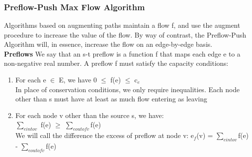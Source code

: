 \documentclass{article}
\begin{document}
\\

\\

\\

\subsubsection{Preflow-Push Max Flow Algorithm}
Algorithms based on augmenting paths maintain a flow f, and use the augment procedure to increase the value of the flow. By way of contrast, the Preflow-Push Algorithm will, in essence, increase the flow on an edge-by-edge basis.\\

\textbf{Preflows} We say that an s-t preflow is a function f that maps each edge e to a non-negative real number. A preflow f must satisfy the capacity conditions:\\

\begin{enumerate}
    \item For each e $\in$ E, we have 0 $\le$ f(e) $\le$ c$_e$\\
    In place of conservation conditions, we only require inequalities. Each node other than s must have at least as much flow entering as leaving
    \item For each node v other than the source s, we have:\\
    $\sum_{e into v}$ f(e) $\ge$ $\sum_{e out of v}$f(e)\\
    We will call the difference the excess of preflow at node v: e$_f$(v) = $\sum_{e into v}$f(e) - $\sum_{e out of v}$f(e)
\end{enumerate}
\end{document}
